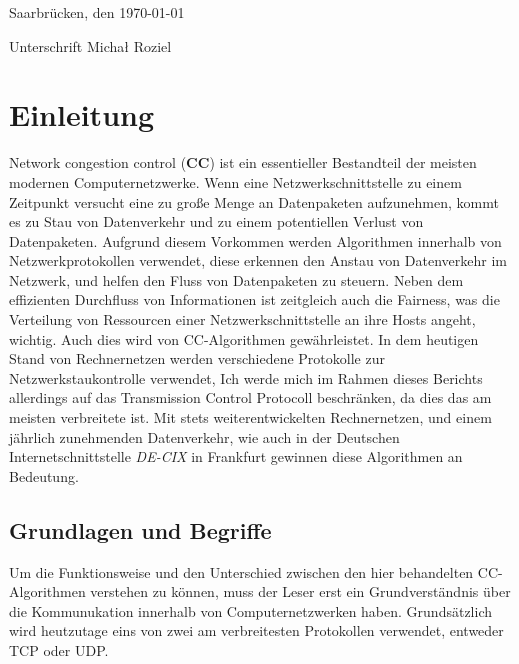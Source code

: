 \documentclass[paper=a4,fontsize=12pt,ngerman]{scrartcl}
\begin{document}
Saarbrücken, den \today

\smallskip
Unterschrift  Micha\l{} Roziel




\clearpage
\tableofcontents 

\clearpage
{}



\section{Einleitung}

Network congestion control (\textbf{CC}) ist ein essentieller Bestandteil der 
meisten modernen Computernetzwerke. 
Wenn eine Netzwerkschnittstelle zu einem Zeitpunkt versucht eine zu große Menge an Datenpaketen aufzunehmen,
kommt es zu Stau von Datenverkehr und zu einem potentiellen Verlust von Datenpaketen.
Aufgrund diesem Vorkommen werden Algorithmen innerhalb von Netzwerkprotokollen verwendet, diese erkennen den Anstau von Datenverkehr im Netzwerk,
und helfen den Fluss von Datenpaketen zu steuern. Neben dem effizienten Durchfluss von Informationen ist zeitgleich auch die Fairness, 
was die Verteilung von Ressourcen einer Netzwerkschnittstelle an ihre Hosts angeht, wichtig. Auch dies wird von CC-Algorithmen gewährleistet.
In dem heutigen Stand von Rechnernetzen werden verschiedene Protokolle zur Netzwerkstaukontrolle verwendet, 
Ich werde mich im Rahmen dieses Berichts allerdings auf das Transmission Control Protocoll beschränken, da dies das am meisten verbreitete ist.  \newline
\newline
Mit stets weiterentwickelten Rechnernetzen, und einem jährlich zunehmenden Datenverkehr, wie auch in der Deutschen Internetschnittstelle
\textit{DE-CIX}\cite{DE-CIX2025} in Frankfurt gewinnen diese Algorithmen an Bedeutung. 






\subsection{Grundlagen und Begriffe}
Um die Funktionsweise und den Unterschied zwischen den hier behandelten CC-Algorithmen verstehen zu können, muss der Leser erst ein Grundverständnis über die Kommunukation innerhalb von Computernetzwerken haben.
Grundsätzlich wird heutzutage eins von zwei am verbreitesten Protokollen verwendet, entweder 
TCP oder UDP. 
\end{document}
